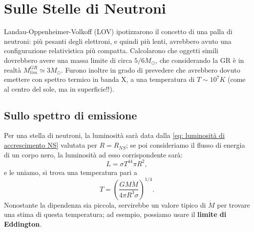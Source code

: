 \chapter{Sulle Stelle di Neutroni}

Landau-Oppenheimer-Volkoff (LOV) ipotizzarono il concetto di una palla di neutroni: più pesanti degli elettroni, e quindi più lenti, avrebbero avuto una configurazione relativistica più compatta. 
Calcolarono che oggetti simili dovrebbero avere una massa limite di circa $5/6 M_{\odot}$, che considerando la GR è in realtà $M_{lim}^{GR}\simeq 3M_{\odot} $.
Furono inoltre in grado di prevedere che avrebbero dovuto emettere con spettro termico in banda X, a una temperatura di $T\sim10^7K$ (come al centro del sole, ma in superficie!!).

\section{Sullo spettro di emissione}
Per una stella di neutroni, la luminosità sarà data dalla \eqref{eq: luminosità di accrescimento NS} valutata per $R=R_{NS}$; se poi consideriamo il flusso di energia di un corpo nero, la luminosità ad esso corrispondente sarà:
\begin{equation}
    L=\sigma T^44\pi R^2,
\end{equation}
e le uniamo, si trova una temperatura pari a
\begin{equation}
    T=\left( \frac{GM\dot{M}}{4\pi R^3\sigma} \right)^{1/4}.
    \label{eq: Temperatura funzione di accrescimento}
\end{equation}
Nonostante la dipendenza sia piccola, servirebbe un valore tipico di $\dot{M}$ per trovare una stima di questa temperatura; ad esempio, possiamo usare il \textbf{limite di Eddington}.

